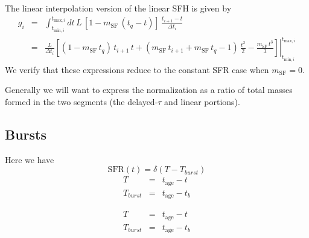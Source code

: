 \documentclass[12pt, letterpaper, preprint]{aastex}
\newcommand{\tmin}[1][]{t_{\mathrm{min} #1}}
\newcommand{\tmax}[1][]{t_{\mathrm{max} #1}}
\newcommand{\dt}{\Delta t_i}
\newcommand{\tintegral}{\int_{\tmin[,i]}^{\tmax[,i]} dt}
\newcommand{\tinterval}{\right|_{\tmin[,i]}^{\tmax[,i]}}
\newcommand{\tage}{t_{\mathrm{age}}}
\newcommand{\sfslope}{m_{\mathrm{SF}}}
\begin{document}
The linear interpolation version of the linear SFH is given by 
\begin{eqnarray}
g_i  & = & \tintegral \,  L\, \left[1 - \sfslope \, (t_q - t)\right] \, \frac{t_{i+1} - t}{\dt}  \nonumber \\
      & = & \frac{L}{\dt} \left.\left[(1-\sfslope\, t_q) \, t_{i+1} \, t + \left(\sfslope\, t_{i+1} + \sfslope \, t_q -1\right)\, \frac{t^2}{2} - \frac{\sfslope\, t^3}{3}\right] \tinterval
\end{eqnarray}
We verify that these expressions reduce to the constant SFR case when $\sfslope=0$.

Generally we will want to express the normalization as a ratio of total masses formed in the two segments (the delayed-$\tau$ and linear portions).

\subsection{Bursts}

Here we have 
\[ 
\mathrm{SFR}(t) = \delta(T - T_{burst})
\]
\begin{eqnarray}
T & = & \tage - t \nonumber \\
T_{burst} & = & \tage - t_b
\end{eqnarray}

\begin{eqnarray}
T & = & \tage - t \nonumber \\
T_{burst} & = & \tage - t_b
\end{eqnarray}
\end{document}
